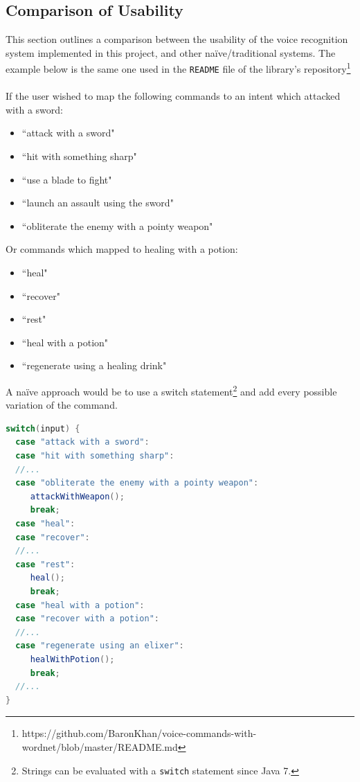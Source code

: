 \documentclass[11pt]{article}
\begin{document}
\begin{appendices}
\newpage
\subsection{Comparison of Usability}
\label{appendix:comparison}

This section outlines a comparison between the usability of the voice recognition system implemented in this project, and other na\"ive/traditional systems. The example below is the same one used in the \texttt{README} file of the library's repository\footnote{https://github.com/BaronKhan/voice-commands-with-wordnet/blob/master/README.md}
\\
\\
If the user wished to map the following commands to an intent which attacked with a sword:

\begin{itemize}
\item ``attack with a sword"
\item ``hit with something sharp"
\item ``use a blade to fight"
\item ``launch an assault using the sword"
\item ``obliterate the enemy with a pointy weapon"
\end{itemize}

Or commands which mapped to healing with a potion:

\begin{itemize}
\item ``heal"
\item ``recover"
\item ``rest"
\item ``heal with a potion"
\item ``regenerate using a healing drink"
\end{itemize}

A na\"ive approach would be to use a switch statement\footnote{Strings can be evaluated with a \texttt{switch} statement since Java 7.} and add every possible variation of the command.

\begin{lstlisting}[language=Java]
switch(input) {
  case "attack with a sword":
  case "hit with something sharp":
  //...
  case "obliterate the enemy with a pointy weapon":
     attackWithWeapon();
     break;
  case "heal":
  case "recover":
  //...
  case "rest":
     heal();
     break;
  case "heal with a potion":
  case "recover with a potion":
  //...
  case "regenerate using an elixer":
     healWithPotion();
     break;
  //...
}
\end{lstlisting}


\end{appendices}
\end{document}
